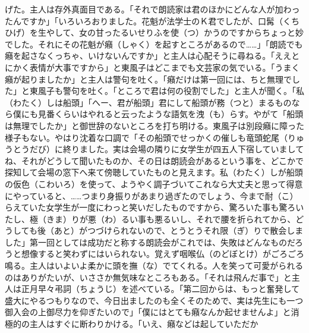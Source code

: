 げた。主人は存外真面目である。「それで朗読家は君のほかにどんな人が加わったんですか」「いろいろおりました。花魁が法学士のＫ君でしたが、口髯（くちひげ）を生やして、女の甘ったるいせりふを使（つ）かうのですからちょっと妙でした。それにその花魁が癪（しゃく）を起すところがあるので\ldots{}\ldots{}」「朗読でも癪を起さなくっちゃ、いけないんですか」と主人は心配そうに尋ねる。「ええとにかく表情が大事ですから」と東風子はどこまでも文芸家の気でいる。「うまく癪が起りましたか」と主人は警句を吐く。「癪だけは第一回には、ちと無理でした」と東風子も警句を吐く。「ところで君は何の役割でした」と主人が聞く。「私（わたく）しは船頭」「へー、君が船頭」君にして船頭が務（つと）まるものなら僕にも見番くらいはやれると云ったような語気を洩（も）らす。やがて「船頭は無理でしたか」と御世辞のないところを打ち明ける。東風子は別段癪に障った様子もない。やはり沈着な口調で「その船頭でせっかくの催しも竜頭蛇尾（りゅうとうだび）に終りました。実は会場の隣りに女学生が四五人下宿していましてね、それがどうして聞いたものか、その日は朗読会があるという事を、どこかで探知して会場の窓下へ来て傍聴していたものと見えます。私（わたく）しが船頭の仮色（こわいろ）を使って、ようやく調子づいてこれなら大丈夫と思って得意にやっていると、\ldots{}\ldots{}つまり身振りがあまり過ぎたのでしょう、今まで耐（こ）らえていた女学生が一度にわっと笑いだしたものですから、驚ろいた事も驚ろいたし、極（きま）りが悪（わ）るい事も悪るいし、それで腰を折られてから、どうしても後（あと）がつづけられないので、とうとうそれ限（ぎ）りで散会しました」第一回としては成功だと称する朗読会がこれでは、失敗はどんなものだろうと想像すると笑わずにはいられない。覚えず咽喉仏（のどぼとけ）がごろごろ鳴る。主人はいよいよ柔かに頭を撫（な）でてくれる。人を笑って可愛がられるのはありがたいが、いささか無気味なところもある。「それは飛んだ事で」と主人は正月早々弔詞（ちょうじ）を述べている。「第二回からは、もっと奮発して盛大にやるつもりなので、今日出ましたのも全くそのためで、実は先生にも一つ御入会の上御尽力を仰ぎたいので」「僕にはとても癪なんか起せませんよ」と消極的の主人はすぐに断わりかける。「いえ、癪などは起していただか